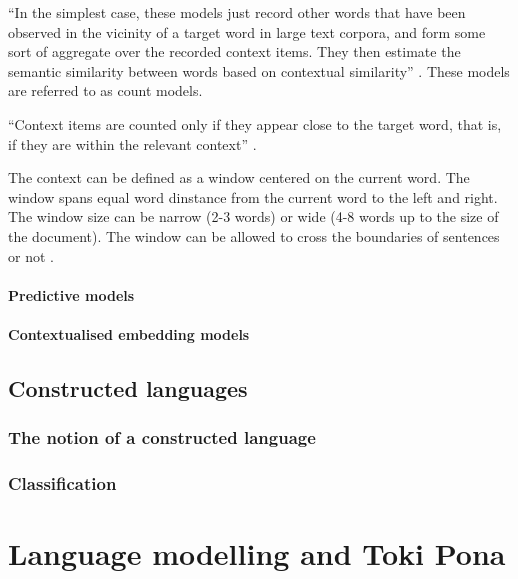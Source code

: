\documentclass[14pt, a4paper]{extreport}
\begin{document}
``In the simplest case, these models just record other words that have been observed in the vicinity of a target word in large text corpora, and form some sort of aggregate over the recorded context items. They then estimate the semantic similarity between words based on contextual similarity'' \parencite{erkkatrin2}. These models are referred to as count models.

``Context items are counted only if they appear close to the target word, that is, if they are within the relevant context'' \parencite{erkkatrin2}.

The context can be defined as a window centered on the current word. The window spans equal word dinstance from the current word to the left and right. The window size can be narrow (2-3 words) or wide (4-8 words up to the size of the document). The window can be allowed to cross the boundaries of sentences or not \parencite{baroni}.

\subsubsection{Predictive models}

\subsubsection{Contextualised embedding models}




%

\section{Constructed languages}

\subsection{The notion of a constructed language}

\subsection{Classification}


\chapter{Language modelling and Toki Pona}
\end{document}
